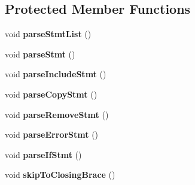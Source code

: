 \subsection*{Protected Member Functions}
\begin{DoxyCompactItemize}
\item 
\hypertarget{classCONFIG4CPP__NAMESPACE_1_1ConfigParser_af5a88acec6fae91a5fcb427e9d554358}{void {\bfseries parse\-Stmt\-List} ()}\label{classCONFIG4CPP__NAMESPACE_1_1ConfigParser_af5a88acec6fae91a5fcb427e9d554358}

\item 
\hypertarget{classCONFIG4CPP__NAMESPACE_1_1ConfigParser_ab383c065f81d9cfc58746f116b8ff90a}{void {\bfseries parse\-Stmt} ()}\label{classCONFIG4CPP__NAMESPACE_1_1ConfigParser_ab383c065f81d9cfc58746f116b8ff90a}

\item 
\hypertarget{classCONFIG4CPP__NAMESPACE_1_1ConfigParser_a2ce3ce02a7ea8d8e0879010c75e03652}{void {\bfseries parse\-Include\-Stmt} ()}\label{classCONFIG4CPP__NAMESPACE_1_1ConfigParser_a2ce3ce02a7ea8d8e0879010c75e03652}

\item 
\hypertarget{classCONFIG4CPP__NAMESPACE_1_1ConfigParser_a5166490f104d27861c8cdb50a707bc99}{void {\bfseries parse\-Copy\-Stmt} ()}\label{classCONFIG4CPP__NAMESPACE_1_1ConfigParser_a5166490f104d27861c8cdb50a707bc99}

\item 
\hypertarget{classCONFIG4CPP__NAMESPACE_1_1ConfigParser_a1a3a120168949e5063444055bdd469d6}{void {\bfseries parse\-Remove\-Stmt} ()}\label{classCONFIG4CPP__NAMESPACE_1_1ConfigParser_a1a3a120168949e5063444055bdd469d6}

\item 
\hypertarget{classCONFIG4CPP__NAMESPACE_1_1ConfigParser_a61ae1ac2164d0472eeb752ad380c6e6c}{void {\bfseries parse\-Error\-Stmt} ()}\label{classCONFIG4CPP__NAMESPACE_1_1ConfigParser_a61ae1ac2164d0472eeb752ad380c6e6c}

\item 
\hypertarget{classCONFIG4CPP__NAMESPACE_1_1ConfigParser_a6e7f827d10772dfd7f1fcc3f1b9bdded}{void {\bfseries parse\-If\-Stmt} ()}\label{classCONFIG4CPP__NAMESPACE_1_1ConfigParser_a6e7f827d10772dfd7f1fcc3f1b9bdded}

\item 
\hypertarget{classCONFIG4CPP__NAMESPACE_1_1ConfigParser_aa26b77130b24a00061163478fcc10d28}{void {\bfseries skip\-To\-Closing\-Brace} ()}\label{classCONFIG4CPP__NAMESPACE_1_1ConfigParser_aa26b77130b24a00061163478fcc10d28}


\end{DoxyCompactItemize}
